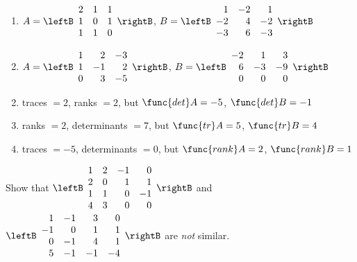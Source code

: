 \begin{multicols}{2}
\begin{ex}
\begin{enumerate}[label={\alph*.}]
\item $A = 
\leftB \begin{array}{rrr}
2 & 1 & 1 \\
1 & 0 & 1 \\
1 & 1 & 0
\end{array} \rightB$, $B = 
\leftB \begin{array}{rrr}
 1 & -2 & 1 \\
-2 & 4 & -2 \\
-3 & 6 & -3 
\end{array} \rightB$

\item $A = 
\leftB \begin{array}{rrr}
1 & 2 & -3 \\
1 & -1 & 2 \\
0 & 3 & -5
\end{array} \rightB$, $B =
\leftB \begin{array}{rrr}
-2 & 1 & 3 \\
 6 & -3 & -9 \\
 0 & 0 & 0
\end{array} \rightB$

\end{enumerate}
\begin{sol}
\begin{enumerate}[label={\alph*.}]
\setcounter{enumi}{1}
\item  traces $= 2$, ranks $= 2$, but $\func{det} A = -5$, $\func{det} B = -1$

\setcounter{enumi}{3}
\item  ranks $= 2$, determinants $= 7$, but $\func{tr} A = 5$, $\func{tr} B = 4$

\setcounter{enumi}{5}
\item  traces $= -5$, determinants $= 0$, but $\func{rank} A = 2$, $\func{rank} B = 1$

\end{enumerate}
\end{sol}
\end{ex}

\begin{ex}
Show that $\leftB \begin{array}{rrrr}
1 & 2 & -1 &  0 \\
2 & 0 &  1 &  1 \\
1 & 1 &  0 & -1 \\
4 & 3 & 0 & 0
\end{array} \rightB$ and $
\leftB \begin{array}{rrrr}
  1 & -1 &  3 &  0 \\
 -1 &  0 &  1 &  1 \\
  0 & -1 &  4 &  1 \\
  5 & -1 & -1 & -4
\end{array} \rightB$ are \textit{not} similar.
\end{ex}


\end{multicols}

